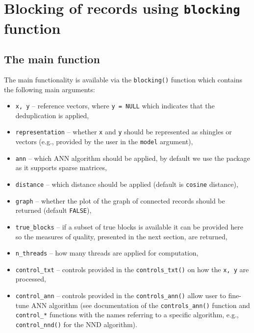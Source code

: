 \section{\texorpdfstring{Blocking of records using \texttt{blocking} function}{Blocking of records using blocking function}}\label{sec-blocks}

\subsection{The main function}\label{the-main-function}

The main functionality is available via the \texttt{blocking()} function which
contains the following main arguments:

\begin{itemize}
\tightlist
\item
  \texttt{x,\ y} -- reference vectors, where \texttt{y\ =\ NULL} which indicates that
  the deduplication is applied,
\item
  \texttt{representation} -- whether \texttt{x} and \texttt{y} should be represented as
  shingles or vectors (e.g., provided by the user in the \texttt{model}
  argument),
\item
  \texttt{ann} -- which ANN algorithm should be applied, by default we use the
   package as it supports sparse matrices,
\item
  \texttt{distance} -- which distance should be applied (default is \texttt{cosine} distance),
\item
  \texttt{graph} -- whether the plot of the graph of connected records should
  be returned (default \texttt{FALSE}),
\item
  \texttt{true\_blocks} -- if a subset of true blocks is available it can be
  provided here so the measures of quality, presented in the next
  section, are returned,
\item
  \texttt{n\_threads} -- how many threads are applied for computation,
\item
  \texttt{control\_txt} -- controls provided in the \texttt{controls\_txt()} on how
  the \texttt{x,\ y} are processed,
\item
  \texttt{control\_ann} -- controls provided in the \texttt{controls\_ann()} allow
  user to fine-tune ANN algorithm (see documentation of the
  \texttt{controls\_ann()} function and \texttt{control\_*} functions with the names
  referring to a specific algorithm, e.g., \texttt{control\_nnd()} for the NND
  algorithm).
\end{itemize}

